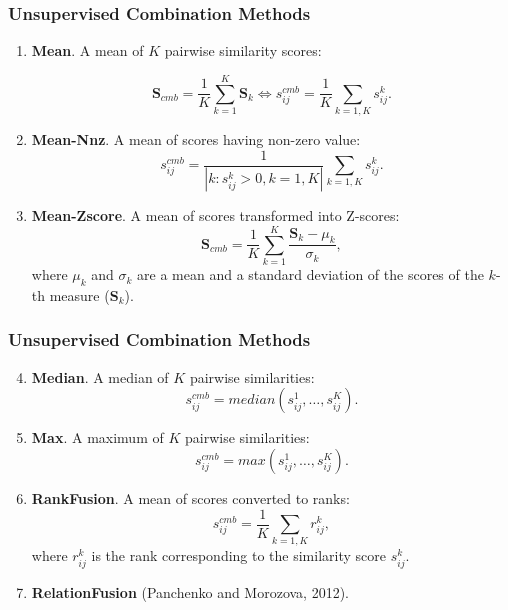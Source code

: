 \documentclass{beamer}
\begin{document}
\begin{frame}
\frametitle{Unsupervised Combination Methods}

\begin{enumerate}
  
\item \textbf{Mean}. A mean of $K$ pairwise similarity scores:

$$\mathbf{S}_{cmb} = \frac{1}{K} \sum_{k=1}^K \mathbf{S}_k \Leftrightarrow 
s_{ij}^{cmb}= \frac{1}{K}\sum_{k=1,K} s_{ij}^k.$$

\item \textbf{Mean-Nnz}. A mean of scores having non-zero value:
 $$s_{ij}^{cmb}= \frac{1}{|k:s_{ij}^k
>0,k=1,K|}\sum_{k=1,K} s_{ij}^k.$$

\item \textbf{Mean-Zscore}. A mean of scores
transformed into Z-scores:
$$\mathbf{S}_{cmb} = \frac{1}{K} \sum_{k=1}^K \frac{\mathbf{S}_k -
\mu_k}{\sigma_k},$$ where $\mu_k$ and $\sigma_k$ are a mean and a standard deviation of the scores of the $k$-th measure ($\mathbf{S}_k$).

\end{enumerate}
\end{frame}



\begin{frame}
\frametitle{Unsupervised Combination Methods}

\begin{enumerate}
  \setcounter{enumi}{3}
\item \textbf{Median}. A median of $K$ pairwise similarities:
$$s_{ij}^{cmb}= median(s_{ij}^1,\ldots,s_{ij}^K). $$

\item \textbf{Max}. A maximum of $K$ pairwise similarities:
$$s_{ij}^{cmb}= max(s_{ij}^1,\ldots,s_{ij}^K).$$

\item \textbf{RankFusion}. A mean of scores converted to ranks:
 $$s_{ij}^{cmb}= \frac{1}{K}\sum_{k=1,K}
r_{ij}^k,$$
where  $r^k_{ij}$ is the rank corresponding to the similarity score $s^k_{ij}$.
\item \textbf{RelationFusion} (Panchenko and Morozova, 2012).
\end{enumerate}

\end{frame}



\end{document}
